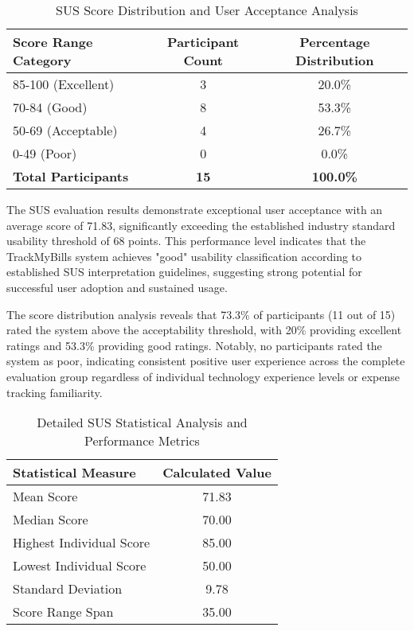 \begin{table}[htbp]
\centering
\caption{SUS Score Distribution and User Acceptance Analysis}
\label{tab:sus-distribution}
\begin{tabular}{|l|c|c|}
\hline
\textbf{Score Range Category} & \textbf{Participant Count} & \textbf{Percentage Distribution} \\
\hline
85-100 (Excellent) & 3 & 20.0\% \\
70-84 (Good) & 8 & 53.3\% \\
50-69 (Acceptable) & 4 & 26.7\% \\
0-49 (Poor) & 0 & 0.0\% \\
\hline
\textbf{Total Participants} & \textbf{15} & \textbf{100.0\%} \\
\hline
\end{tabular}
\end{table}

The SUS evaluation results demonstrate exceptional user acceptance with an average score of 71.83, significantly exceeding the established industry standard usability threshold of 68 points. This performance level indicates that the TrackMyBills system achieves "good" usability classification according to established SUS interpretation guidelines, suggesting strong potential for successful user adoption and sustained usage.

The score distribution analysis reveals that 73.3\% of participants (11 out of 15) rated the system above the acceptability threshold, with 20\% providing excellent ratings and 53.3\% providing good ratings. Notably, no participants rated the system as poor, indicating consistent positive user experience across the complete evaluation group regardless of individual technology experience levels or expense tracking familiarity.

\begin{table}[htbp]
\centering
\caption{Detailed SUS Statistical Analysis and Performance Metrics}
\label{tab:sus-statistics}
\begin{tabular}{|l|c|}
\hline
\textbf{Statistical Measure} & \textbf{Calculated Value} \\
\hline
Mean Score & 71.83 \\
Median Score & 70.00 \\
Highest Individual Score & 85.00 \\
Lowest Individual Score & 50.00 \\
Standard Deviation & 9.78 \\
Score Range Span & 35.00 \\
\hline
\end{tabular}
\end{table}

